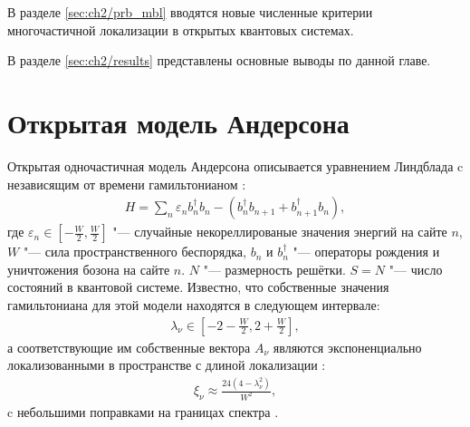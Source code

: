 В разделе \cref{sec:ch2/prb_mbl} вводятся новые численные критерии многочастичной локализации в открытых квантовых системах.

В разделе \cref{sec:ch2/results} представлены основные выводы по данной главе.

\section{Открытая модель Андерсона}\label{sec:ch2/anderson}
Открытая одночастичная модель Андерсона описывается уравнением Линдблада  c независящим от времени гамильтонианом \cite{Anderson1958}:
\begin{equation}
	\label{eq:anderson_H}
	\begin{gathered}
		H = \sum_{n} \varepsilon_n b^\dagger_n b_n - \left(b^\dagger_n b_{n+1} + b^\dagger_{n+1} b_{n}\right),
	\end{gathered}
\end{equation}
где \(\varepsilon_n \in \left[-\frac{W}{2}, \frac{W}{2}\right]\) "--- случайные некореллированые значения энергий на сайте \(n\), \(W\) "--- сила пространственного беспорядка, \(b_n\) и \(b^\dagger_n\) "--- операторы рождения и уничтожения бозона на сайте \(n\). \(N\) "--- размерность решётки. \(S=N\) "--- число состояний в квантовой системе. Известно, что собственные значения гамильтониана для этой модели находятся в следующем интервале:
\begin{equation}
	\label{eq:anderson_evals}
	\begin{gathered}
		\lambda_\nu \in \left[-2-\frac{W}{2}, 2+\frac{W}{2}\right],
	\end{gathered}
\end{equation}
а соответствующие им собственные вектора \(A_\nu\) являются экспоненциально локализованными в пространстве с длиной локализации \cite{Thouless1983}:
\begin{equation}
	\label{eq:anderson_loc_length}
	\begin{gathered}
		\xi_{\nu} \approx \frac{24\left(4-\lambda_\nu^2\right)}{W^2},
	\end{gathered}
\end{equation}
c небольшими поправками на границах спектра \cite{derrida1984lyapounov}.

